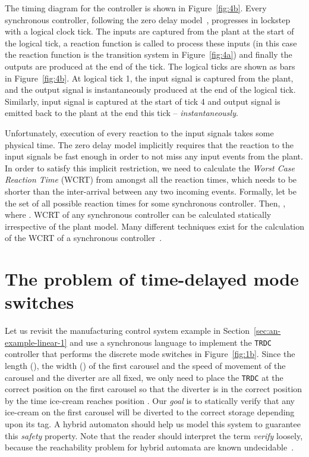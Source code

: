 \documentclass[10pt,journal,cspaper,compsoc]{IEEEtran}
\begin{document}
The timing diagram for the controller is shown in
Figure~\ref{fig:4b}. Every synchronous controller, following the zero
delay model~\cite{berry96}, progresses in lockstep with a logical clock
tick. The inputs are captured from the plant at the start of the logical
tick, a reaction function is called to process these inputs (in this
case the reaction function is the transition system in
Figure~\ref{fig:4a}) and finally the outputs are produced at the end of
the tick. The logical ticks are shown as bars in Figure~\ref{fig:4b}. At
logical tick 1, the input signal  is captured from the plant, and
the output signal  is instantaneously produced at the end of the
logical tick. Similarly, input signal  is captured at the start of
tick 4 and output signal is emitted back to the plant at the end this
tick -- \textit{instantaneously}.

Unfortunately, execution of every reaction to the input signals takes
some  physical time. The zero delay model implicitly requires
that the reaction to the input signals be fast enough in order to not
miss any input events from the plant. In order to satisfy this implicit
restriction, we need to calculate the \textit{Worst Case Reaction Time}
(WCRT) from amongst all the reaction times, which needs to be shorter
than the inter-arrival between any two incoming events. Formally, let
 be the set of all possible reaction times
for some synchronous controller. Then, , where
\mbox{}. WCRT of any synchronous controller can
be calculated statically irrespective of the plant model. Many different
techniques exist for the calculation of the WCRT of a synchronous
controller~\cite{wilhelm08}.



\section{The problem of time-delayed mode switches}
\label{sec:motivating-example}





Let us revisit the manufacturing control system example in
Section~\ref{sec:an-example-linear-1} and use a synchronous language to
implement the \texttt{TRDC} controller that performs the discrete mode
switches in Figure~\ref{fig:1b}. Since the length (), the width
() of the first carousel and the speed of movement of the
carousel and the diverter are all fixed, we only need to place the
\texttt{TRDC} at the correct position on the first carousel so that the
diverter is in the correct position by the time ice-cream reaches
position . Our \textit{goal} is to statically verify that any
ice-cream on the first carousel will be diverted to the correct storage
depending upon its tag. A hybrid automaton should help us model this
system to guarantee this \textit{safety} property. Note that the reader
should interpret the term \textit{verify} loosely, because the
reachability problem for hybrid automata are known
undecidable~\cite{alur1993hybrid}.
\end{document}
